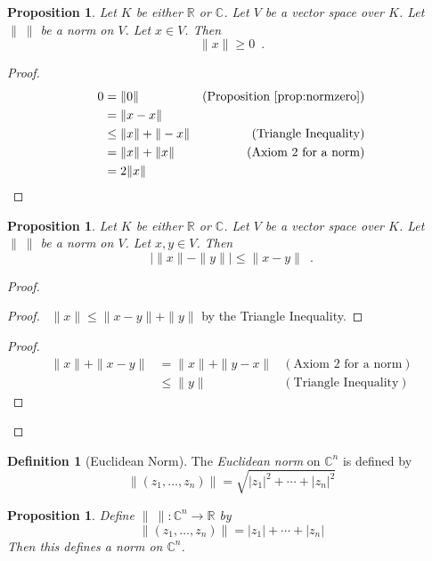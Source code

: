 \documentclass{book}
\let\qed\relax
\newtheorem{prop}[ax]{Proposition}
\theoremstyle{definition}
\newtheorem{df}[ax]{Definition}
\begin{document}
\begin{prop}
Let $K$ be either $\mathbb{R}$ or $\mathbb{C}$. Let $V$ be a vector space over $K$. Let $\|\ \|$ be a norm on $V$. Let $x \in V$. Then
\[ \| x \| \geq 0 \enspace . \]
\end{prop}

\begin{proof}
\pf
\begin{align*}
0 & = \| 0 \| &  (\text{Proposition \ref{prop:normzero}}) \\
& = \| x - x \| \\
& \leq \| x \| + \| - x \| & (\text{Triangle Inequality}) \\
& = \| x \| + \| x \| & (\text{Axiom 2 for a norm}) \\
& = 2 \| x\| & \qed
\end{align*}
\end{proof}

\begin{prop}
\label{prop:distancebetweennorms}
Let $K$ be either $\mathbb{R}$ or $\mathbb{C}$. Let $V$ be a vector space over $K$. Let $\|\ \|$ be a norm on $V$. Let $x,y \in V$. Then
\[ | \| x \| - \| y \| | \leq \| x - y \| \enspace . \]
\end{prop}

\begin{proof}
\pf
{}
\begin{proof}
	\pf\ $\|x\| \leq \| x - y \| + \|y \|$ by the Triangle Inequality.
\end{proof}
\begin{proof}
	\pf
	\begin{align*}
		\| x \| + \| x - y \| & = \| x \| + \| y - x\| & (\text{Axiom 2 for a norm}) \\
		& \leq \| y \| & (\text{Triangle Inequality})
	\end{align*}
\end{proof}
\qed
\end{proof}

\begin{df}[Euclidean Norm]
The \emph{Euclidean norm} on $\mathbb{C}^n$ is defined by
\[ \| (z_1, \ldots, z_n) \| = \sqrt{|z_1|^2 + \cdots + |z_n|^2} \]
\end{df}

\begin{prop}
Define $\|\ \| : \mathbb{C}^n \rightarrow \mathbb{R}$ by
\[ \| (z_1, \ldots, z_n) \| = |z_1| + \cdots + |z_n| \]
Then this defines a norm on $\mathbb{C}^n$.
\end{prop}
\end{document}
